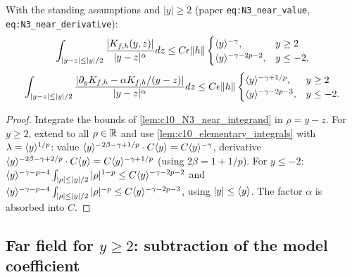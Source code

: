 \begin{lemma}
  \label{lem:c10_N3_near}
  With the standing assumptions and $|y|\ge2$ (paper \texttt{eq:N3\_near\_value}, \texttt{eq:N3\_near\_derivative}):
  \[
    \int_{|y-z|\le|y|/2}\frac{|K_{f,h}(y,z)|}{|y-z|^\alpha}dz\le C\epsilon\|h\|\begin{cases}\langle y \rangle^{-\gamma},&y\ge2\\\langle y \rangle^{-\gamma-2p-2},&y\le-2,\end{cases}
  \]
  \[
    \int_{|y-z|\le|y|/2}\frac{|\partial_yK_{f,h}-\alpha K_{f,h}/(y-z)|}{|y-z|^\alpha}dz\le C\epsilon\|h\|\begin{cases}\langle y \rangle^{-\gamma+1/p},&y\ge2\\\langle y \rangle^{-\gamma-2p-3},&y\le-2.\end{cases}
  \]
\end{lemma}
\begin{proof}
  Integrate the bounds of \cref{lem:c10_N3_near_integrand} in $\rho=y-z$. For $y\ge2$, extend to all
  $\rho\in\mathbb{R}$ and use \cref{lem:c10_elementary_integrals} with $\lambda=\langle y \rangle^{1/p}$: value
  $\langle y \rangle^{-2\beta-\gamma+1/p}\cdot C\langle y \rangle=C\langle y \rangle^{-\gamma}$, derivative
  $\langle y \rangle^{-2\beta-\gamma+2/p}\cdot C\langle y \rangle=C\langle y \rangle^{-\gamma+1/p}$ (using $2\beta=1+1/p$). For $y\le-2$:
  $\langle y \rangle^{-\gamma-p-4}\int_{|\rho|\le|y|/2}|\rho|^{1-p}\le C\langle y \rangle^{-\gamma-2p-2}$ and
  $\langle y \rangle^{-\gamma-p-4}\int_{|\rho|\le|y|/2}|\rho|^{-p}\le C\langle y \rangle^{-\gamma-2p-3}$, using
  $|y|\le\langle y \rangle$. The factor $\alpha$ is absorbed into $C$.
\end{proof}

\subsection{Far field for $y\ge2$: subtraction of the model coefficient}


